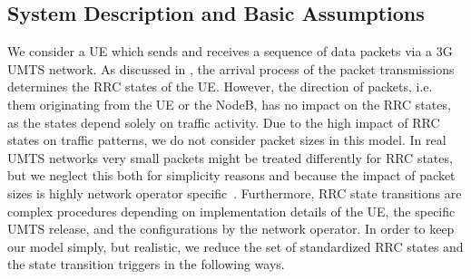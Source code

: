 \subsection{System Description and Basic Assumptions}\label{sec:network:performance_model:system_description}

We consider a \gls{UE} which sends and receives a sequence of data packets via a \gls{3G} \gls{UMTS} network.
As discussed in , the arrival process of the packet transmissions determines the \gls{RRC} states of the \gls{UE}.
However, the direction of packets, i.e. them originating from the \gls{UE} or the \gls{NodeB}, has no impact on the \gls{RRC} states, as the states depend solely on traffic activity.
Due to the high impact of \gls{RRC} states on traffic patterns, we do not consider packet sizes in this model.
In real \gls{UMTS} networks very small packets might be treated differently for \gls{RRC} states, but we neglect this both for simplicity reasons and because the impact of packet sizes is highly network operator specific~\cite{Qian2010a}.
Furthermore, \gls{RRC} state transitions are complex procedures depending on implementation details of the \gls{UE}, the specific \gls{UMTS} release, and the configurations by the network operator.
In order to keep our model simply, but realistic, we reduce the set of standardized \gls{RRC} states and the state transition triggers in the following ways. 

